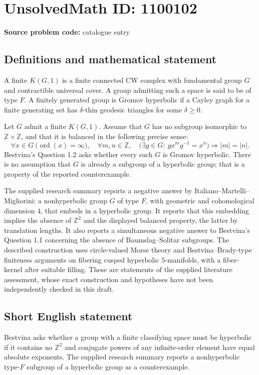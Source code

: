 \documentclass[11pt]{article}
\newcommand{\Z}{\mathbb{Z}}
\begin{document}
\section*{UnsolvedMath ID: 1100102}
\textbf{Source problem code:} catalogue entry
\subsection{Definitions and mathematical statement}
A finite $K(G,1)$ is a finite connected CW complex with fundamental group $G$ and contractible universal cover. A group admitting such a space is said to be of type $F$. A finitely generated group is Gromov hyperbolic if a Cayley graph for a finite generating set has $\delta$-thin geodesic triangles for some $\delta\geq0$.

Let $G$ admit a finite $K(G,1)$. Assume that $G$ has no subgroup isomorphic to $\Z\times\Z$, and that it is balanced in the following precise sense:
\[
\forall x\in G\ \bigl(\operatorname{ord}(x)=\infty\bigr),\quad
\forall m,n\in\Z,\quad
\bigl(\exists g\in G:\ gx^mg^{-1}=x^n\bigr)
\Longrightarrow |m|=|n|.
\]
Bestvina's Question 1.2 asks whether every such $G$ is Gromov hyperbolic. There is no assumption that $G$ is already a subgroup of a hyperbolic group; that is a property of the reported counterexample.

The supplied research summary reports a negative answer by Italiano--Martelli--Migliorini: a nonhyperbolic group $G$ of type $F$, with geometric and cohomological dimension $4$, that embeds in a hyperbolic group. It reports that this embedding implies the absence of $\Z^2$ and the displayed balanced property, the latter by translation lengths. It also reports a simultaneous negative answer to Bestvina's Question 1.1 concerning the absence of Baumslag--Solitar subgroups. The described construction uses circle-valued Morse theory and Bestvina--Brady-type finiteness arguments on fibering cusped hyperbolic $5$-manifolds, with a fiber-kernel after suitable filling. These are statements of the supplied literature assessment, whose exact construction and hypotheses have not been independently checked in this draft.
\subsection{Short English statement}
Bestvina asks whether a group with a finite classifying space must be hyperbolic if it contains no $\Z^2$ and conjugate powers of any infinite-order element have equal absolute exponents. The supplied research summary reports a nonhyperbolic type-$F$ subgroup of a hyperbolic group as a counterexample.
\end{document}
